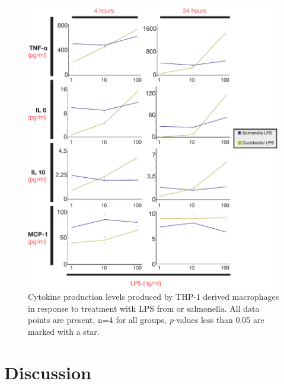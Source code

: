         \begin{figure}[p]
          \begin{center}
            \includegraphics[width=\textwidth]{lps_chapter/img/cytokineprofile.pdf}
          \end{center}
          \caption[Cytokine profile comparing \caulobacter{} and \ac{salmonella} \ac{LPS}]{
            Cytokine production levels produced by THP-1 derived macrophages in response to treatment with \ac{LPS} from \caulobacter{} or \ac{salmonella}.  All data points are present, n=4 for all groups, \textit{p}-values less than 0.05 are marked with a star.
          }
          \label{fig:cytokineprofile}
        \end{figure}    

        \section{Discussion} %
        \label{sec:lps_discussion}

